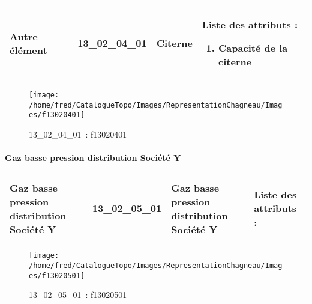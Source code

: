 \documentclass[12pt,titlepage]{book}
\begin{document}
\renewcommand{\arraystretch}{1.2}
\begin{supertabular}{|p{10cm}|c|p{13cm}|p{12cm}|}
 Autre élément & 13\_02\_04\_01 & Citerne & Liste des attributs :
\begin{enumerate}
  \item Capacité de la citerne\end{enumerate}
\\
\hline
\end{supertabular}
\begin{figure}[h!]
  \hfill         %
  \begin{minipage}[t]{3cm}
    \begin{center}
      \texttt{[image: /home/fred/CatalogueTopo/Images/RepresentationChagneau/Images/f13020401]}
      \caption[~13\_02\_04\_01]{\small{13\_02\_04\_01~:} \tiny{f13020401}}\label{f13020401}
    \end{center}
  \end{minipage}
\end{figure}


\paragraph{Gaz basse pression distribution Société Y}
\noindent
\vspace{\baselineskip}

\renewcommand{\arraystretch}{1.2}
\begin{supertabular}{|p{10cm}|c|p{13cm}|p{12cm}|}
 Gaz basse pression distribution Société Y & 13\_02\_05\_01 & Gaz basse pression distribution Société Y & Liste des attributs :
\begin{enumerate}
\end{enumerate}
\\
\hline
\end{supertabular}
\begin{figure}[h!]
  \hfill         %
  \begin{minipage}[t]{3cm}
    \begin{center}
      \texttt{[image: /home/fred/CatalogueTopo/Images/RepresentationChagneau/Images/f13020501]}
      \caption[~13\_02\_05\_01]{\small{13\_02\_05\_01~:} \tiny{f13020501}}\label{f13020501}
    \end{center}
  \end{minipage}
\end{figure}
\end{document}
